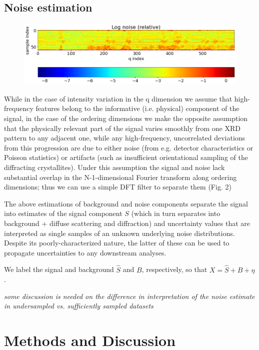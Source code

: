 \documentclass[12pt]{iopart}
\begin{document}
\subsection{Noise estimation}
\begin{figure}
  \includegraphics[width=\linewidth]{figures/noise.png}
  \caption{}
  \label{fig:noise}
\end{figure}
While in the case of intensity variation in the q dimension we assume
that high-frequency features belong to the informative (i.e. physical)
component of the signal, in the case of the ordering dimensions we
make the opposite assumption that the physically relevant part of the
signal varies smoothly from one XRD pattern to any adjacent one, while
any high-frequency, uncorrelated deviations from this progression are
due to either noise (from e.g. detector characteristics or Poisson
statistics) or artifacts (such as insufficient orientational sampling
of the diffracting crystallites). Under this assumption the signal and
noise lack substantial overlap in the N-1-dimensional Fourier transform
along ordering dimensions; thus we can use a simple DFT filter to
separate them (Fig. 2)

The above estimations of background and noise components separate
the signal into estimates of the signal component $S$ (which in turn separates into
background + diffuse scattering and diffraction) and uncertainty values
that are interpreted as single samples of an unknown underlying noise distributions. Despite its poorly-characterized nature, the latter of these can be used to propagate uncertainties to any downstream analyses. 

We label the signal and background $\hat{S}$ and $B$, respectively,
so that $X = \hat{S} + B + \eta$.



\emph{some discussion is needed on the difference in interpretation of the noise estimate in undersampled vs. sufficiently sampled datasets}

\section{Methods and Discussion}
\end{document}
